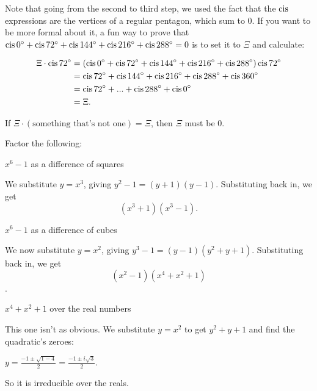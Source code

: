 \documentclass[../key.tex]{subfiles}
\newcommand{\cisdeg}[1] {\cis #1^\circ}
\begin{document}
Note that going from the second to third step, we used the fact that the $\operatorname{cis}$ expressions are the vertices of a regular pentagon, which sum to $0$. If you want to be more formal about it, a fun way to prove that $\cisdeg{0} + \cisdeg{72} + \cisdeg{144} + \cisdeg{216} + \cisdeg{288}=0$ is to set it to $\Xi$ and calculate:

\begin{align*}
    \Xi\cdot \cisdeg{72} &= (\cisdeg{0} + \cisdeg{72} + \cisdeg{144} + \cisdeg{216} + \cisdeg{288}) \cisdeg{72} \\
    &= \cisdeg{72} + \cisdeg{144} + \cisdeg{216} + \cisdeg{288} + \cisdeg{360} \\
    &= \cisdeg{72} + ... + \cisdeg{288} + \cisdeg{0} \\
    &= \Xi.
\end{align*}

If $\Xi\cdot (\text{something that's not one})=\Xi$, then $\Xi$ must be $0$.

\begin{outer_problem}
\item Factor the following:
\end{outer_problem}

\begin{inner_problem}[start=1]
\item $x^6-1$ as a difference of squares
\end{inner_problem}

We substitute $y=x^3$, giving $y^2-1=(y+1)(y-1)$. Substituting back in, we get $$(x^3+1)(x^3-1).$$

\begin{inner_problem}
\item $x^6-1$ as a difference of cubes
\end{inner_problem}

We now substitute $y=x^2$, giving $y^3-1 = (y-1)(y^2+y+1)$. Substituting back in, we get $$(x^2-1)(x^4+x^2+1)$$.

\begin{inner_problem}
\item $x^4+x^2+1$ over the real numbers
\end{inner_problem}

This one isn't as obvious. We substitute $y=x^2$ to get $y^2+y+1$ and find the quadratic's zeroes:

$y=\frac{-1\pm \sqrt{1 - 4}}{2} = \frac{-1\pm i\sqrt{3}}{2}.$

So it is irreducible over the reals.
\end{document}
